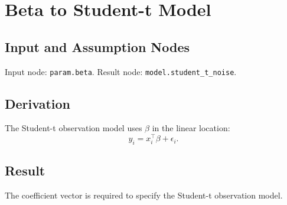 \section{Beta to Student-t Model}
\label{edge:beta-to-student-t-model}

\subsection{Input and Assumption Nodes}
Input node: \texttt{param.beta}. Result node: \texttt{model.student\_t\_noise}.

\subsection{Derivation}
The Student-t observation model uses \(\beta\) in the linear location:
\[
  y_i = x_i^\top\beta + \epsilon_i.
\]

\subsection{Result}
The coefficient vector is required to specify the Student-t observation model.
